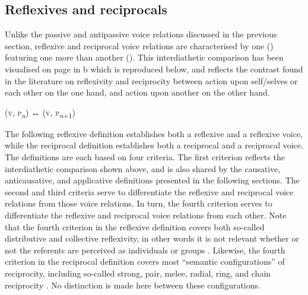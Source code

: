 \subsection{Reflexives and reciprocals} \label{def:reflexives-reciprocals}
Unlike the passive and antipassive voice relations discussed in the previous section, reflexive and reciprocal voice relations are characterised by one  () featuring one  more than another  (). This interdiathetic comparison has been visualised on page \pageref{fig:ch2:diathetic-relations} in b which is reproduced below, and reflects the contrast found in the literature on reflexivity and reciprocity between action upon self/selves or each other on the one hand, and action upon another  on the other hand.

\smallskip

\noindent
\begin{center}
	 (\textsc{v}, \textsc{p}\textsubscript{\textit{n}}) ↔  (\textsc{v}, \textsc{p}\textsubscript{\textit{n}+1})
\end{center}

\smallskip

The following reflexive definition establishes both a reflexive  and a reflexive voice, while the reciprocal definition establishes both a reciprocal  and a reciprocal voice. The definitions are each based on four criteria. The first criterion reflects the interdiathetic comparison shown above, and is also shared by the causative, anticausative, and applicative definitions presented in the following sections. The second and third criteria serve to differentiate the reflexive and reciprocal voice relations from those voice relations. In turn, the fourth criterion serves to differentiate the reflexive and reciprocal voice relations from each other. Note that the fourth criterion in the reflexive definition covers both so-called distributive and collective reflexivity, in other words it is not relevant whether or not the referents are perceived as individuals or groups \citep[159ff.]{zuniga:kittila:2019}. Likewise, the fourth criterion in the reciprocal definition covers most “semantic configurations” of reciprocity, including so-called strong, pair, melee, radial, ring, and chain reciprocity \citep{majid:al:2011, evans:al:2011}. No distinction is made here between these configurations. 

